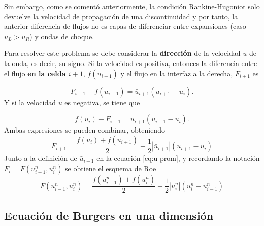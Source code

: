 \documentclass[12pt]{article}
\begin{document}
	Sin embargo, como se comentó anteriormente, la condición Rankine-Hugoniot solo devuelve la velocidad de propagación de una discontinuidad y por tanto, la anterior diferencia de flujos no es capas de diferenciar entre expansiones (caso $u_L > u_R$) y ondas de choque.
	
	Para resolver este problema se debe considerar la \textbf{dirección} de la velocidad $\bar{u}$ de la onda, es decir, su signo. Si la velocidad es positiva, entonces la diferencia entre el flujo \textbf{en la celda $i+1$}, $f(u_{i+1})$ y el flujo en la interfaz a la derecha, $F_{i+1}$ es
	
	\begin{equation}
		F_{i+1} - f(u_{i+1}) = \bar{u}_{i+1} (u_{i+1}-u_{i}).
	\end{equation}
	Y si la velocidad $\bar{u}$ es negativa, se tiene que
	
	\begin{equation}
		f(u_{i}) - F_{i+1} = \bar{u}_{i+1} (u_{i+1}-u_{i}).
	\end{equation}
	Ambas expresiones se pueden combinar, obteniendo
	\begin{equation}
		F_{i+1} = \frac{f(u_{i}) + f(u_{i+1})}{2} - \frac{1}{2}\left|\bar{u}_{i+1}\right|(u_{i+1}-u_{i})
	\end{equation}
	Junto a la definición de $\bar{u}_{i+1}$ en la ecuación \ref{eq:u-prom}, y recordando la notación $F_i = F(u_{i-1}^{n}, u_{i}^{n})$ se obtiene el esquema de Roe
	\begin{equation}
		\boxed{F(u_{i-1}^{n}, u_{i}^{n}) = \frac{f(u_{i-1}^{n}) + f(u_{i}^{n})}{2} - \frac{1}{2}\left|\bar{u}_{i}^{n}\right|(u_{i}^{n}-u_{i-1}^{n})}
	\end{equation}
	\clearpage
	\subsection{Ecuación de Burgers en una dimensión}
\end{document}
